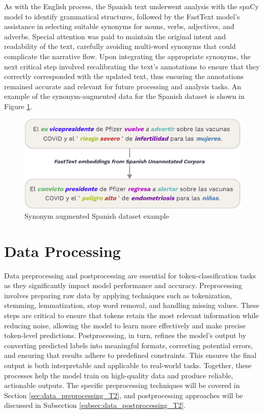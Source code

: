 \documentclass{Configuration_Files/PoliMi3i_thesis}
\begin{document}
As with the English process, the Spanish text underwent analysis with the spaCy model to identify grammatical structures, followed by the FastText model's assistance in selecting suitable synonyms for nouns, verbs, adjectives, and adverbs. Special attention was paid to maintain the original intent and readability of the text, carefully avoiding multi-word synonyms that could complicate the narrative flow. Upon integrating the appropriate synonyms, the next critical step involved recalibrating the text's annotations to ensure that they correctly corresponded with the updated text, thus ensuring the annotations remained accurate and relevant for future processing and analysis tasks. An example of the synonym-augmented data for the Spanish dataset is shown in Figure \ref{fig:syn_es}.

\begin{figure}[h!]
 \centering
 \includegraphics[width=0.79\linewidth, height=0.23\textheight]{Images/syn_es.png}
 \caption{Synonym augmented Spanish dataset example}
 \label{fig:syn_es}
\end{figure}
\FloatBarrier

\section{Data Processing} \label{sec:data_processing_T2}
Data preprocessing and postprocessing are essential for token-classification tasks as they significantly impact model performance and accuracy. Preprocessing involves preparing raw data by applying techniques such as tokenization, stemming, lemmatization, stop word removal, and handling missing values. These steps are critical to ensure that tokens retain the most relevant information while reducing noise, allowing the model to learn more effectively and make precise token-level predictions. Postprocessing, in turn, refines the model’s output by converting predicted labels into meaningful formats, correcting potential errors, and ensuring that results adhere to predefined constraints. This ensures the final output is both interpretable and applicable to real-world tasks. Together, these processes help the model train on high-quality data and produce reliable, actionable outputs. The specific preprocessing techniques will be covered in Section \ref{sec:data_preprocessing_T2}, and postprocessing approaches will be discussed in Subsection \ref{subsec:data_postprocessing_T2}.
\end{document}

